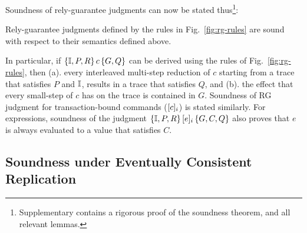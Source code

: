 Soundness of rely-guarantee judgments can now be stated
thus\footnote{Supplementary contains a rigorous proof of the soundness
theorem, and all relevant lemmas.}:
\begin{theorem}[Soundness] 
Rely-guarantee judgments defined by the rules in
Fig.~\ref{fig:rg-rules} are sound with respect to their semantics
defined above. 
\end{theorem}
\noindent In particular, if $\{\mathbb{I},P,R\}\,c\,\{G,Q\}$ can be derived using
the rules of Fig.~\ref{fig:rg-rules}, then (a). every interleaved
multi-step reduction of $c$ starting from a trace that satisfies $P$
and $\mathbb{I}$, results in a trace that satisfies $Q$, and (b). the effect
that every small-step of $c$ has on the trace is contained in $G$.
Soundness of RG judgment for transaction-bound commands
($\lbrack c \rbrack_i$) is stated similarly.  For expressions, soundness of
the judgment $\{\mathbb{I},P,R\}\,\lbrack e \rbrack_i\,\{G,C,Q\}$ also proves that $e$
is always evaluated to a value that satisfies $C$.

\subsection{Soundness under Eventually Consistent Replication}

